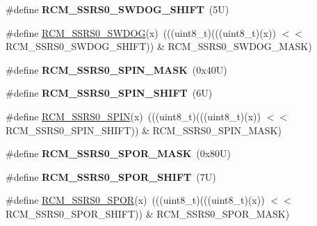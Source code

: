 \begin{DoxyCompactItemize}
\mbox{\label{group___r_c_m___register___masks_gaa72b7e034a3729d143ff4841151455f5}} 
\#define {\bfseries R\+C\+M\+\_\+\+S\+S\+R\+S0\+\_\+\+S\+W\+D\+O\+G\+\_\+\+S\+H\+I\+FT}~(5\+U)
\item 
\#define \mbox{\hyperlink{group___r_c_m___register___masks_ga70ccb04369e0a82fab12cccbdc4fa332}{R\+C\+M\+\_\+\+S\+S\+R\+S0\+\_\+\+S\+W\+D\+OG}}(x)~(((uint8\+\_\+t)(((uint8\+\_\+t)(x)) $<$$<$ R\+C\+M\+\_\+\+S\+S\+R\+S0\+\_\+\+S\+W\+D\+O\+G\+\_\+\+S\+H\+I\+FT)) \& R\+C\+M\+\_\+\+S\+S\+R\+S0\+\_\+\+S\+W\+D\+O\+G\+\_\+\+M\+A\+SK)
\item 
\mbox{\label{group___r_c_m___register___masks_gac419b312cc0de8475fa37a15ff6bdf90}} 
\#define {\bfseries R\+C\+M\+\_\+\+S\+S\+R\+S0\+\_\+\+S\+P\+I\+N\+\_\+\+M\+A\+SK}~(0x40\+U)
\item 
\mbox{\label{group___r_c_m___register___masks_ga4580b9a2f74398a25dfd3b95caca81c6}} 
\#define {\bfseries R\+C\+M\+\_\+\+S\+S\+R\+S0\+\_\+\+S\+P\+I\+N\+\_\+\+S\+H\+I\+FT}~(6\+U)
\item 
\#define \mbox{\hyperlink{group___r_c_m___register___masks_gad2286c0e758ea0f0b46aeba5d8a662e7}{R\+C\+M\+\_\+\+S\+S\+R\+S0\+\_\+\+S\+P\+IN}}(x)~(((uint8\+\_\+t)(((uint8\+\_\+t)(x)) $<$$<$ R\+C\+M\+\_\+\+S\+S\+R\+S0\+\_\+\+S\+P\+I\+N\+\_\+\+S\+H\+I\+FT)) \& R\+C\+M\+\_\+\+S\+S\+R\+S0\+\_\+\+S\+P\+I\+N\+\_\+\+M\+A\+SK)
\item 
\mbox{\label{group___r_c_m___register___masks_gaa1112cdfb72b4686bd29687a6e213cff}} 
\#define {\bfseries R\+C\+M\+\_\+\+S\+S\+R\+S0\+\_\+\+S\+P\+O\+R\+\_\+\+M\+A\+SK}~(0x80\+U)
\item 
\mbox{\label{group___r_c_m___register___masks_ga38d21374637cac449dfd791c1dfe1066}} 
\#define {\bfseries R\+C\+M\+\_\+\+S\+S\+R\+S0\+\_\+\+S\+P\+O\+R\+\_\+\+S\+H\+I\+FT}~(7\+U)
\item 
\#define \mbox{\hyperlink{group___r_c_m___register___masks_gaba4ec92a9d5b13731727dd925f297a0d}{R\+C\+M\+\_\+\+S\+S\+R\+S0\+\_\+\+S\+P\+OR}}(x)~(((uint8\+\_\+t)(((uint8\+\_\+t)(x)) $<$$<$ R\+C\+M\+\_\+\+S\+S\+R\+S0\+\_\+\+S\+P\+O\+R\+\_\+\+S\+H\+I\+FT)) \& R\+C\+M\+\_\+\+S\+S\+R\+S0\+\_\+\+S\+P\+O\+R\+\_\+\+M\+A\+SK)
\end{DoxyCompactItemize}
